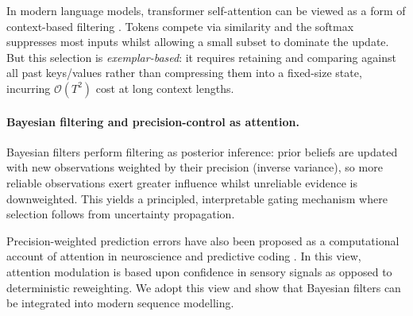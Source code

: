 \documentclass{article}
\begin{document}
In modern language models, transformer self-attention can be viewed as a form of context-based filtering \citep{vaswani2017attention}.
Tokens compete via similarity and the softmax suppresses most inputs whilst allowing a small subset to dominate the update.
But this selection is \emph{exemplar-based}: it requires retaining and comparing against all past keys/values rather than compressing them into a fixed-size state, incurring $\mathcal{O}(T^2)$ cost at long context lengths.


\paragraph{Bayesian filtering and precision-control as attention.}
Bayesian filters perform filtering as posterior inference: prior beliefs are updated with new observations weighted by their precision (inverse variance), so more reliable observations exert greater influence whilst unreliable evidence is downweighted.
This yields a principled, interpretable gating mechanism where selection follows from uncertainty propagation.

Precision-weighted prediction errors have also been proposed as a computational account of attention in neuroscience and predictive coding \citep{rao1999predictive,feldman2010attention}.
In this view, attention modulation is based upon
confidence in sensory signals as opposed to deterministic reweighting.
We adopt this view and show that Bayesian filters can be integrated into modern sequence modelling.
\end{document}
